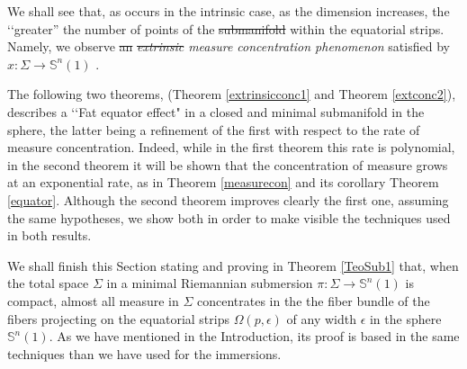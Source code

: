 \documentclass{amsart}
\theoremstyle{definition}
\theoremstyle{remark}
\newcommand{\ese}{\mathbb{S}}
\providecommand{\DIFadd}[1]{{\protect\color{blue}\uwave{#1}}} %
\providecommand{\DIFdel}[1]{{\protect\color{red}\sout{#1}}}                      %
\providecommand{\DIFaddbegin}{} %
\providecommand{\DIFaddend}{} %
\providecommand{\DIFdelbegin}{} %
\providecommand{\DIFdelend}{} %
\begin{document}
We shall see that, as occurs in the intrinsic case, as the dimension increases, the \lq\lq greater'' the number of points of the \DIFdelbegin \DIFdel{submanifold }\DIFdelend \DIFaddbegin \DIFadd{sets $x(\Sigma)$ or $\pi(\Sigma)$ }\DIFaddend within the equatorial strips. Namely, we observe \DIFdelbegin \DIFdel{an }\DIFdelend \DIFaddbegin \DIFadd{a }\DIFaddend \emph{\DIFdelbegin \DIFdel{extrinsic }\DIFdelend measure concentration phenomenon} satisfied by $x: \Sigma\to \mathbb{S}^n(1)$ \DIFaddbegin \DIFadd{and $\pi:\Sigma^m \to \mathbb{S}^n(1)$}\DIFaddend .

The following \DIFaddbegin \DIFadd{first }\DIFaddend two  theorems, (Theorem \ref{extrinsicconc1} and Theorem \ref{extconc2}), describes a \lq\lq Fat equator effect" in a closed and minimal submanifold in the sphere, the latter being a refinement of the first with respect to the rate of measure concentration. Indeed, while in the first theorem this rate is polynomial, in the second theorem it will be shown that the concentration of measure grows at an exponential rate, as in Theorem \ref{measurecon} and its corollary  Theorem \ref{equator}. Although the second theorem improves clearly the first one, assuming the same hypotheses, we show both in order to make visible the techniques used in both results.

We shall finish this Section stating and proving in Theorem \ref{TeoSub1}  that, when the total space $\Sigma$ in a minimal Riemannian submersion $\pi: \Sigma \rightarrow \ese^n(1)$ is compact, almost all measure in $\Sigma$ concentrates in the the fiber bundle of the fibers projecting on the equatorial strips $\Omega(p, \epsilon)$ of any width $\epsilon$ in the sphere $\ese^n(1)$. As we have mentioned in the Introduction, its proof is based in the same techniques than we have used for the immersions.
\end{document}
